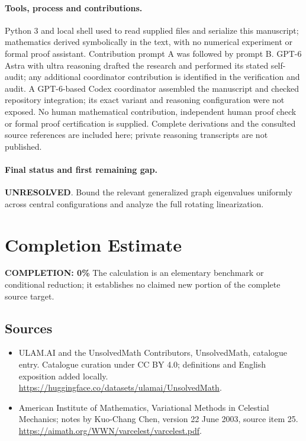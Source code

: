 \documentclass[11pt]{article}
\begin{document}
\paragraph{Tools, process and contributions.}
Python 3 and local shell used to read supplied files and serialize this manuscript; mathematics derived symbolically in the text, with no numerical experiment or formal proof assistant. Contribution prompt A was followed by prompt B. GPT-6 Astra with ultra reasoning drafted the research and performed its stated self-audit; any additional coordinator contribution is identified in the verification and audit. A GPT-6-based Codex coordinator assembled the manuscript and checked repository integration; its exact variant and reasoning configuration were not exposed. No human mathematical contribution, independent human proof check or formal proof certification is supplied. Complete derivations and the consulted source references are included here; private reasoning transcripts are not published.

\paragraph{Final status and first remaining gap.}
\textbf{UNRESOLVED}. Bound the relevant generalized graph eigenvalues uniformly across central configurations and analyze the full rotating linearization.

\section{Completion Estimate}
\noindent\textbf{COMPLETION: 0\%}
The calculation is an elementary benchmark or conditional reduction; it establishes no claimed new portion of the complete source target.

\subsection{Sources}
\begin{itemize}
\item[\hypertarget{source:statement:1}{S1}] ULAM.AI and the UnsolvedMath Contributors, UnsolvedMath, catalogue entry. Catalogue curation under CC BY 4.0; definitions and English exposition added locally.
\url{https://huggingface.co/datasets/ulamai/UnsolvedMath}.
\item[\hypertarget{source:statement:2}{S2}] American Institute of Mathematics, Variational Methods in Celestial Mechanics; notes by Kuo-Chang Chen, version 22 June 2003, source item 25.
\url{https://aimath.org/WWN/varcelest/varcelest.pdf}.
\end{itemize}
\label{end:statement}
\end{document}
